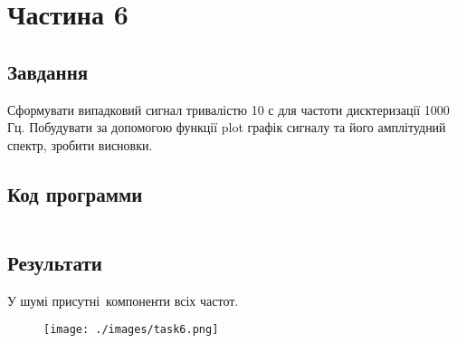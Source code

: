 \section{Частина 6}
\label{sec:task6}

\subsection{Завдання}
\label{subsec:task6_task}

Сформувати випадковий сигнал тривалістю 10 с для частоти
дисктеризації 1000 Гц. Побудувати за допомогою функції plot графік сигналу та
його амплітудний спектр, зробити висновки.

\subsection{Код программи}
\label{subsec:task6_code}
\inputminted{python}{../src/task6.py}

\subsection{Результати}
\label{subsec:task6_results}

У шумі присутні компоненти всіх частот.

\begin{figure}[!ht]
    \centering
    \texttt{[image: ./images/task6.png]}
\end{figure}
